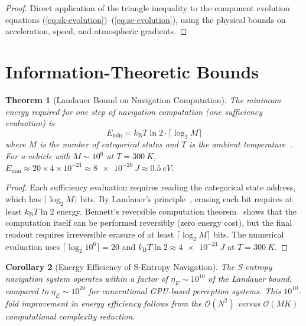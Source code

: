 \documentclass[twocolumn,10pt]{article}
\newtheorem{theorem}{Theorem}[section]
\newtheorem{corollary}[theorem]{Corollary}
\theoremstyle{definition}
\theoremstyle{remark}
\newcommand{\kB}{k_{\mathrm{B}}}
\newcommand{\Ocal}{\mathcal{O}}
\begin{document}
\begin{proof}
Direct application of the triangle inequality to the component
evolution equations (\ref{eq:sk-evolution})--(\ref{eq:se-evolution}),
using the physical bounds on acceleration, speed, and atmospheric
gradients.
\end{proof}


\section{Information-Theoretic Bounds}\label{app:info-theory}

\begin{theorem}[Landauer Bound on Navigation Computation]\label{thm:landauer}
The minimum energy required for one step of navigation computation
(one sufficiency evaluation) is
\begin{equation}\label{eq:landauer-nav}
  E_{\min} = \kB T \ln 2 \cdot \lceil \log_2 M \rceil
\end{equation}
where $M$ is the number of categorical states and $T$ is the ambient
temperature~\cite{landauer1961,bennett1973,bennett1982}. For a vehicle
with $M \sim 10^6$ at $T = \SI{300}{K}$,
$E_{\min} \approx 20 \times 4 \times 10^{-21} \approx \SI{8e-20}{J}
\approx \SI{0.5}{eV}$.
\end{theorem}

\begin{proof}
Each sufficiency evaluation requires reading the categorical state address,
which has $\lceil \log_2 M \rceil$ bits. By Landauer's
principle~\cite{landauer1961}, erasing each bit requires at least $\kB T
\ln 2$ energy. Bennett's reversible computation
theorem~\cite{bennett1973,bennett1982} shows that the computation itself
can be performed reversibly (zero energy cost), but the final readout
requires irreversible erasure of at least $\lceil \log_2 M \rceil$ bits.
The numerical evaluation uses $\lceil \log_2 10^6 \rceil = 20$ and
$\kB T \ln 2 \approx \SI{4e-21}{J}$ at $T = \SI{300}{K}$.
\end{proof}

\begin{corollary}[Energy Efficiency of S-Entropy Navigation]\label{cor:energy-efficiency}
The S-entropy navigation system operates within a factor of
$\eta_E \sim 10^{10}$ of the Landauer bound, compared to
$\eta_E \sim 10^{20}$ for conventional GPU-based perception systems.
This $10^{10}$-fold improvement in energy efficiency follows from the
$\Ocal(N^2)$ versus $\Ocal(MK)$ computational complexity reduction.
\end{corollary}
\end{document}
